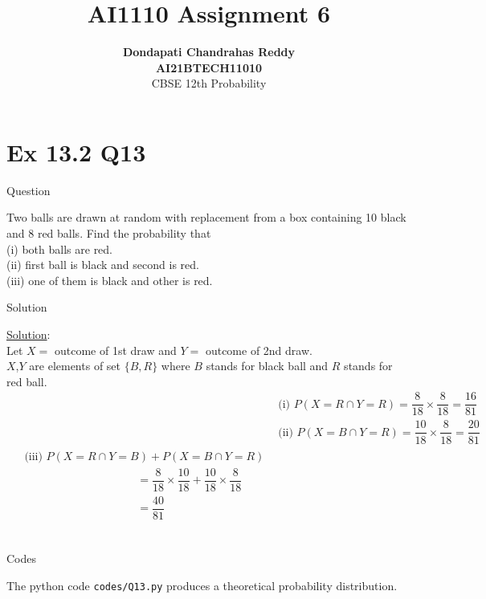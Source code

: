 \documentclass{beamer}
\title{\textbf{AI1110 Assignment 6} }
\author{\textbf{Dondapati Chandrahas Reddy}\\\textbf{AI21BTECH11010}\\ CBSE 12th Probability}
\begin{document}
\begin{frame}
	\titlepage 
\end{frame}

\section{Ex 13.2 Q13}
\begin{frame}{Question}

Two balls are drawn at random with replacement from a box containing 10 black
and 8 red balls. Find the probability that\\
(i) both balls are red.\\
(ii) first ball is black and second is red.\\
(iii) one of them is black and other is red.\\

\end{frame}

\begin{frame}{Solution}
	
{\large \underline{Solution}:}\\

Let $X=$ outcome of 1st draw and $Y=$ outcome of 2nd draw.\\

$X$,$Y$ are elements of set $\{B,R\}$ where $B$ stands for black ball and $R$ stands for red ball.
\begin{align}
	&\text{(i) } P(X=R \cap Y=R) = \dfrac{8}{18} \times \dfrac{8}{18}  = \dfrac{16}{81}\\[1em]
	&\text{(ii) } P(X=B \cap Y=R) = \dfrac{10}{18} \times \dfrac{8}{18}  = \dfrac{20}{81}\\[1em]
	\begin{split}
	&\text{(iii) } P(X=R \cap Y=B) + P(X=B \cap Y=R)\\[1ex]
	& \hspace{120pt} = \dfrac{8}{18} \times \dfrac{10}{18} + \dfrac{10}{18} \times \dfrac{8}{18}\\[1ex]
	&  \hspace{120pt} = \dfrac{40}{81} 
	\end{split}
\end{align}\\

\end{frame}

\begin{frame}{Codes}
	
The python code \texttt{codes/Q13.py} produces a theoretical probability distribution.

\end{frame}
\end{document}
